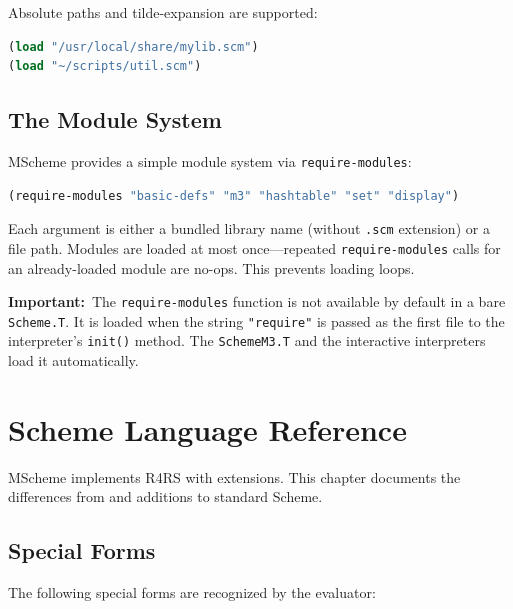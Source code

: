 \documentclass[12pt]{report}
\begin{document}
Absolute paths and tilde-expansion are supported:

\begin{lstlisting}[language=Scheme]
(load "/usr/local/share/mylib.scm")
(load "~/scripts/util.scm")
\end{lstlisting}

\section{The Module System}\label{sec:modules}

MScheme provides a simple module system via {\tt require-modules}:

\begin{lstlisting}[language=Scheme]
(require-modules "basic-defs" "m3" "hashtable" "set" "display")
\end{lstlisting}

Each argument is either a bundled library name (without {\tt .scm}
extension) or a file path.  Modules are loaded at most once---repeated
{\tt require-modules} calls for an already-loaded module are no-ops.
This prevents loading loops.

\medskip\noindent\textbf{Important:}\ The {\tt require-modules} function is not available
by default in a bare {\tt Scheme.T}.  It is loaded when the string
{\tt "require"} is passed as the first file to the interpreter's
{\tt init()} method.  The {\tt SchemeM3.T} and the interactive
interpreters load it automatically.


\chapter{Scheme Language Reference}

MScheme implements R4RS with extensions.  This chapter documents
the differences from and additions to standard Scheme.

\section{Special Forms}

The following special forms are recognized by the evaluator:
\end{document}
